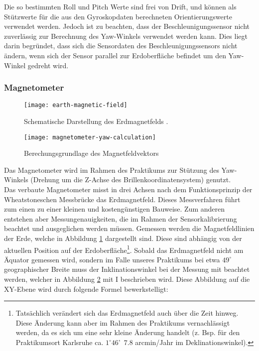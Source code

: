 Die so bestimmten Roll und Pitch Werte sind frei von Drift, und können als Stützwerte für die aus den Gyroskopdaten berechneten Orientierungswerte verwendet werden. Jedoch ist zu beachten, dass der Beschleunigungssensor nicht zuverlässig zur Berechnung des Yaw-Winkels verwendet werden kann. Dies liegt darin begründet, dass sich die Sensordaten des Beschleunigungssensors nicht ändern, wenn sich der Sensor parallel zur Erdoberfläche befindet um den Yaw-Winkel gedreht wird.



\subsubsection{Magnetometer}
\label{headtracking_magnetometer_subsubsec}
\begin{figure}
   \centering
   \texttt{[image: earth-magnetic-field]}
   \caption[mag_world]{Schematische Darstellung des Erdmagnetfelds \cite{mag_world_source}.}
   \label{fig:mag_world}
\end{figure}

\begin{figure}
   \centering
   \texttt{[image: magnetometer-yaw-calculation]}
   \caption[mag_mapping]{Berechungsgrundlage des Magnetfeldvektors}
   \label{fig:mag_mapping}
\end{figure}
Das Magnetometer wird im Rahmen des Praktikums zur Stützung des Yaw-Winkels (Drehung um die Z-Achse des Brillenkoordinatensystem) genutzt.\\
Das verbaute Magnetometer misst in drei Achsen nach dem Funktionsprinzip der Wheatstoneschen Messbrücke \cite{renaudin2010complete} das Erdmagnetfeld.
Dieses Messverfahren führt zum einen zu einer kleinen und kostengünstigen Bauweise.
Zum anderen entstehen aber Messungenauigkeiten, die im Rahmen der Sensorkalibrierung beachtet und ausgeglichen werden müssen.
Gemessen werden die Magnetfeldlinien der Erde, welche in Abbildung \ref{fig:mag_world} dargestellt sind.
Diese sind abhängig von der aktuellen Position auf der Erdoberfläche\footnote{Tatsächlich verändert sich das Erdmagnetfeld auch über die Zeit hinweg.
Diese Änderung kann aber im Rahmen des Praktikums vernachlässigt werden, da es sich um eine sehr kleine Änderung handelt (z. Bsp. für den Praktikumsort Karlsruhe ca. $1^\circ 46$'~$7.8$ arcmin/Jahr im Deklinationswinkel).}.
Sobald das Erdmagnetfeld nicht am Äquator gemessen wird, sondern im Falle unseres Praktikums bei etwa $49^\circ$ geographischer Breite muss der Inklinationswinkel bei der Messung mit beachtet werden, welcher in Abbildung \ref{fig:mag_mapping} mit I beschrieben wird.
Diese Abbildung auf die XY-Ebene wird durch folgende Formel bewerkstelligt:

